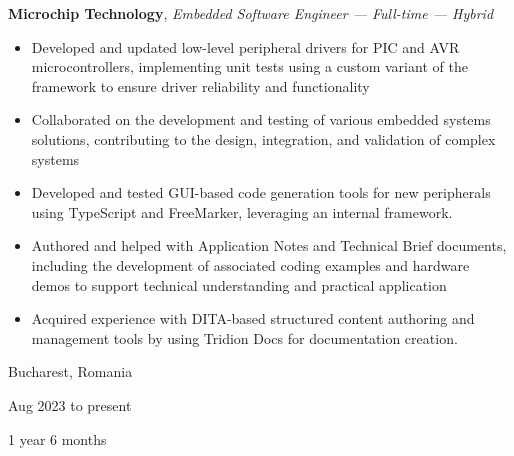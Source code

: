 \documentclass[10pt, letterpaper]{article}
\newenvironment{highlights}{
    \begin{itemize}[
        topsep=0.1 cm,
        parsep=0.1 cm,
        partopsep=0pt,
        itemsep=0pt,
        leftmargin=0 cm + 10pt
    ]
}{
    \end{itemize}
} %
\newenvironment{twocolentry}[2][]{
    \onecolentry
    \def\secondColumn{#2}
    \setcolumnwidth{\fill, 3.5 cm}
    \begin{paracol}{2}
}{
    \switchcolumn \raggedleft \secondColumn
    \end{paracol}
    \endonecolentry
} %
\let\hrefWithoutArrow\href
\renewcommand{\href}[2]{\hrefWithoutArrow{#1}{\ifthenelse{\equal{#2}{}}{ }{#2 }\raisebox{.15ex}{\footnotesize \faExternalLink*}}}
\begin{document}
        
        \begin{twocolentry}{
            Bucharest, Romania

        Aug 2023 to present

        1 year 6 months
        }
            \textbf{Microchip Technology}, \textit{Embedded Software Engineer — Full-time — Hybrid}
            \begin{highlights}
                \item Developed and updated low-level peripheral drivers for PIC and AVR microcontrollers, implementing unit tests using a custom variant of the \href{https://www.throwtheswitch.org/unity}{Unity} framework to ensure driver reliability and functionality
                \item Collaborated on the development and testing of various embedded systems solutions, contributing to the design, integration, and validation of complex systems
                \item Developed and tested GUI-based code generation tools for new peripherals using TypeScript and FreeMarker, leveraging an internal framework.
                \item Authored and helped with Application Notes and Technical Brief documents, including the development of associated coding examples and hardware demos to support technical understanding and practical application
                \item Acquired experience with DITA-based structured content authoring and management tools by using Tridion Docs for documentation creation.
            \end{highlights}
        \end{twocolentry}


        \vspace{0.2 cm}
\end{document}
